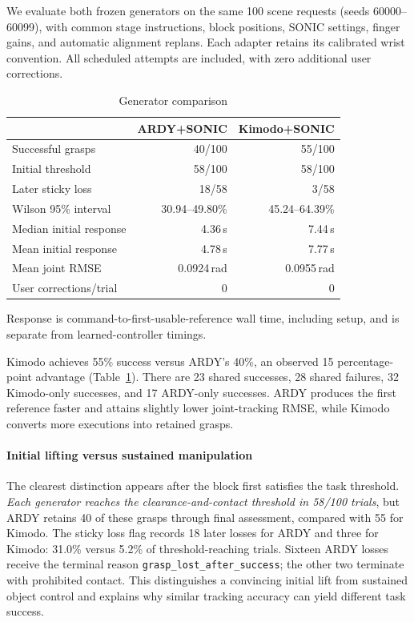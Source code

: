 We evaluate both frozen generators on the same 100 scene requests (seeds 60000--60099), with common stage instructions, block positions, SONIC settings, finger gains, and automatic alignment replans. Each adapter retains its calibrated wrist convention. All scheduled attempts are included, with zero additional user corrections.

\begin{table}[t]
\centering
\caption{Generator comparison}
\label{tab:generators}
\begin{tabular}{lrr}
\toprule
 & ARDY+SONIC & Kimodo+SONIC\\
\midrule
Successful grasps & 40/100 & 55/100\\
Initial threshold & 58/100 & 58/100\\
Later sticky loss & 18/58 & 3/58\\
Wilson 95\% interval & 30.94--49.80\% & 45.24--64.39\%\\
Median initial response & 4.36\,s & 7.44\,s\\
Mean initial response & 4.78\,s & 7.77\,s\\
Mean joint RMSE & 0.0924\,rad & 0.0955\,rad\\
User corrections/trial & 0 & 0\\
\bottomrule
\end{tabular}
\end{table}
Response is command-to-first-usable-reference wall time, including setup, and is separate from learned-controller timings.

Kimodo achieves 55\% success versus ARDY's 40\%, an observed 15 percentage-point advantage (Table~\ref{tab:generators}). There are 23 shared successes, 28 shared failures, 32 Kimodo-only successes, and 17 ARDY-only successes. ARDY produces the first reference faster and attains slightly lower joint-tracking RMSE, while Kimodo converts more executions into retained grasps.

\paragraph{Initial lifting versus sustained manipulation}
The clearest distinction appears after the block first satisfies the task threshold. \emph{Each generator reaches the clearance-and-contact threshold in 58/100 trials}, but ARDY retains 40 of these grasps through final assessment, compared with 55 for Kimodo. The sticky loss flag records 18 later losses for ARDY and three for Kimodo: 31.0\% versus 5.2\% of threshold-reaching trials. Sixteen ARDY losses receive the terminal reason \texttt{grasp\_lost\_after\_success}; the other two terminate with prohibited contact. This distinguishes a convincing initial lift from sustained object control and explains why similar tracking accuracy can yield different task success.

